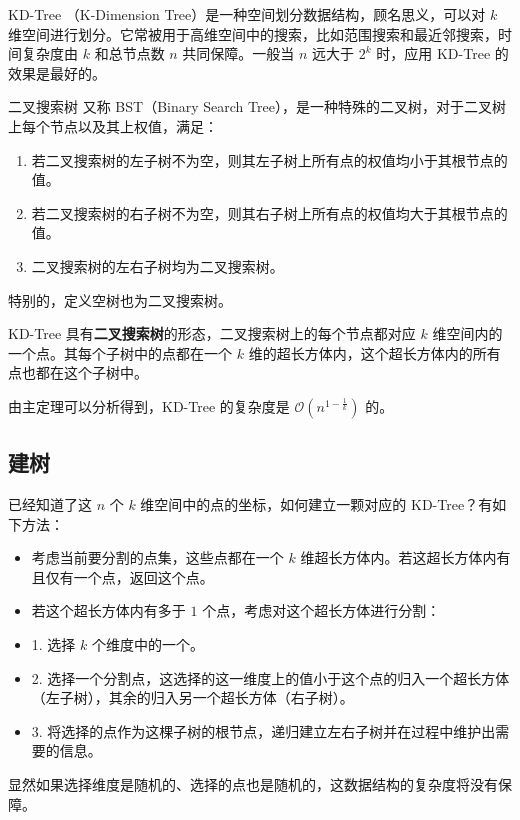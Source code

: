 
KD-Tree （K-Dimension Tree）是一种空间划分数据结构，顾名思义，可以对 $k$ 维空间进行划分。它常被用于高维空间中的搜索，比如范围搜索和最近邻搜索，时间复杂度由 $k$ 和总节点数 $n$ 共同保障。一般当 $n$ 远大于 $2^k$ 时，应用 KD-Tree 的效果是最好的。

\begin{definition}{二叉搜索树}
又称 BST（Binary Search Tree），是一种特殊的二叉树，对于二叉树上每个节点以及其上权值，满足：
\begin{enumerate}
\item 若二叉搜索树的左子树不为空，则其左子树上所有点的权值均小于其根节点的值。
\item 若二叉搜索树的右子树不为空，则其右子树上所有点的权值均大于其根节点的值。
\item 二叉搜索树的左右子树均为二叉搜索树。
\end{enumerate}
特别的，定义空树也为二叉搜索树。
\end{definition}

KD-Tree 具有\textbf{二叉搜索树}的形态，二叉搜索树上的每个节点都对应 $k$ 维空间内的一个点。其每个子树中的点都在一个 $k$ 维的超长方体内，这个超长方体内的所有点也都在这个子树中。

由主定理可以分析得到，KD-Tree 的复杂度是 $\mathcal O\left(n^{1-\frac 1k}\right)$ 的。

\subsection{建树}

已经知道了这 $n$ 个 $k$ 维空间中的点的坐标，如何建立一颗对应的 KD-Tree？有如下方法：

\begin{itemize}
\item 考虑当前要分割的点集，这些点都在一个 $k$ 维超长方体内。若这超长方体内有且仅有一个点，返回这个点。
\item 若这个超长方体内有多于 $1$ 个点，考虑对这个超长方体进行分割：
\item 1. 选择 $k$ 个维度中的一个。
    \item 2. 选择一个分割点，这选择的这一维度上的值小于这个点的归入一个超长方体（左子树），其余的归入另一个超长方体（右子树）。
    \item 3. 将选择的点作为这棵子树的根节点，递归建立左右子树并在过程中维护出需要的信息。
\end{itemize}

显然如果选择维度是随机的、选择的点也是随机的，这数据结构的复杂度将没有保障。

